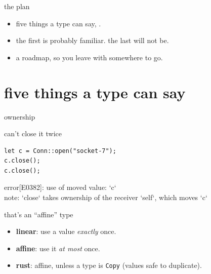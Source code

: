   \begin{frame}{the plan}
    \begin{itemize}
      \item five things a type can say, .
      \item the first is probably familiar. the last will not be.
      \item a roadmap, so you leave with somewhere to go.
    \end{itemize}
  \end{frame}

  \section{five things a type can say}
  \begin{frame}{ownership}
  \end{frame}

  \begin{frame}[fragile]{can't close it twice}
    \vfill
\begin{lstlisting}[morekeywords={let}]
let c = Conn::open("socket-7");
c.close();
c.close();
\end{lstlisting}
    \vskip6pt
    {\ttfamily\small\textcolor{copper}{error[E0382]: use of moved value: `c`}}\\[2pt]
    {\ttfamily\small\textcolor{mute}{note: `close` takes ownership of the receiver `self`, which moves `c`}}
    \vfill
  \end{frame}

  \begin{frame}{that's an “affine” type}
    \begin{itemize}
      \item \textbf{linear}: use a value \emph{exactly} once.
      \item \textbf{affine}: use it \emph{at most} once.
      \item \textbf{rust}: affine, unless a type is \texttt{Copy} (values safe to duplicate).
    \end{itemize}
  \end{frame}

